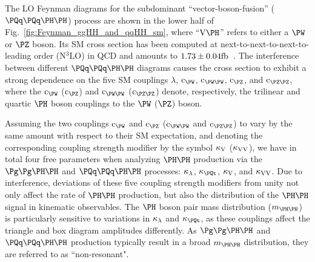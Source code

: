 The LO Feynman diagrams for the subdominant ``vector-boson-fusion'' ($\qqHH$) process are shown in the lower half of Fig.~\ref{fig:Feynman_ggHH_and_qqHH_sm},
where ``$\VH$'' refers to either a $\PW$ or $\PZ$ boson.
Its SM cross section has been computed at next-to-next-to-next-to-leading order (N$^{3}$LO) in QCD
and amounts to $1.73 \pm 0.04\text{fb}$~\cite{Dreyer:2018qbw}.
The interference between different $\qqHH$ diagrams causes the cross section to exhibit a strong dependence on the five SM couplings
$\lambda$, $\cW$, $\cWW$, $\cZ$, and $\cZZ$,
where the $\cW$ ($\cZ$) and $\cWW$ ($\cZZ$) denote, respectively, the trilinear and quartic $\PHiggs$ boson couplings to the $\PW$ ($\PZ$) boson.

Assuming the two couplings $\cW$ and $\cZ$ ($\cWW$ and $\cZZ$) to vary by the same amount with respect to their SM expectation, 
and denoting the corresponding coupling strength modifier by the symbol $\kappa_{\textrm{V}}$ ($\kappa_{\textrm{V}\textrm{V}}$), we have in total four free parameters
when analyzing $\HH$ production via the $\ggHH$ and $\qqHH$ processes: $\kappa_{\lambda}$, $\kappat$, $\kappa_{\textrm{V}}$, and $\kappa_{\textrm{V}\textrm{V}}$.
Due to interference, deviations of these five coupling strength modifiers from unity not only affect the rate of $\HH$ production,
but also the distribution of the $\HH$ signal in kinematic observables.
The $\PHiggs$ boson pair mass distribution ($\mHH$) is particularly sensitive to variations in $\kappa_{\lambda}$ and $\kappat$,
as these couplings affect the triangle and box diagram amplitudes differently.
As $\ggHH$ and $\qqHH$ production typically result in a broad $\mHH$ distribution,
they are referred to as ``non-resonant".

